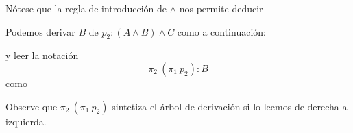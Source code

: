 \documentclass{article}
\begin{document}
\begin{remark}
    Nótese que la regla de introducción de $\wedge$ nos permite deducir
    \begin{prooftree}
    \end{prooftree}

    Podemos derivar $B$ de $p_2 : (A \wedge B) \wedge C$
    como a continuación:

    \begin{prooftree}
    \end{prooftree}

    y leer la notación
    $$\pi_2\ (\pi_1\ p_2) : B$$
    como 
    \begin{center}
    \end{center}
    Observe que $\pi_2\ (\pi_1\ p_2)$ sintetiza el árbol de derivación si lo 
    leemos de derecha a izquierda.
\end{remark}
\end{document}
